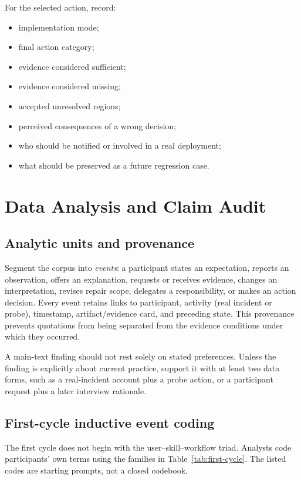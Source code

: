 For the selected action, record:

\begin{itemize}[leftmargin=*]
    \item implementation mode;
    \item final action category;
    \item evidence considered sufficient;
    \item evidence considered missing;
    \item accepted unresolved regions;
    \item perceived consequences of a wrong decision;
    \item who should be notified or involved in a real deployment;
    \item what should be preserved as a future regression case.
\end{itemize}

\section{Data Analysis and Claim Audit}
\label{app:analysis}

\subsection{Analytic units and provenance}

Segment the corpus into \emph{events}: a participant states an expectation,
reports an observation, offers an explanation, requests or receives evidence,
changes an interpretation, revises repair scope, delegates a responsibility, or
makes an action decision. Every event retains links to participant, activity
(real incident or probe), timestamp, artifact/evidence card, and preceding
state. This provenance prevents quotations from being separated from the
evidence conditions under which they occurred.

A main-text finding should not rest solely on stated preferences. Unless the
finding is explicitly about current practice, support it with at least two data
forms, such as a real-incident account plus a probe action, or a participant
request plus a later interview rationale.

\subsection{First-cycle inductive event coding}

The first cycle does not begin with the user--skill--workflow triad. Analysts
code participants' own terms using the families in Table~\ref{tab:first-cycle}.
The listed codes are starting prompts, not a closed codebook.


